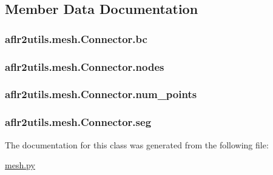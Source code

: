 \subsection{Member Data Documentation}
\hypertarget{classaflr2utils_1_1mesh_1_1Connector_a59689632fcfb6fc3470d0163b29bd823}{
\subsubsection[{bc}]{\setlength{\rightskip}{0pt plus 5cm}aflr2utils.\-mesh.\-Connector.\-bc}}\label{classaflr2utils_1_1mesh_1_1Connector_a59689632fcfb6fc3470d0163b29bd823}
\hypertarget{classaflr2utils_1_1mesh_1_1Connector_a820425dc41d23724ecab5ce72f336d0b}{
\subsubsection[{nodes}]{\setlength{\rightskip}{0pt plus 5cm}aflr2utils.\-mesh.\-Connector.\-nodes}}\label{classaflr2utils_1_1mesh_1_1Connector_a820425dc41d23724ecab5ce72f336d0b}
\hypertarget{classaflr2utils_1_1mesh_1_1Connector_a1c20205fb5946a6b3d5e9c2cf86f9173}{
\subsubsection[{num\-\_\-points}]{\setlength{\rightskip}{0pt plus 5cm}aflr2utils.\-mesh.\-Connector.\-num\-\_\-points}}\label{classaflr2utils_1_1mesh_1_1Connector_a1c20205fb5946a6b3d5e9c2cf86f9173}
\hypertarget{classaflr2utils_1_1mesh_1_1Connector_aeaa7d5ba24f17928e1c0c60cc2b92f70}{
\subsubsection[{seg}]{\setlength{\rightskip}{0pt plus 5cm}aflr2utils.\-mesh.\-Connector.\-seg}}\label{classaflr2utils_1_1mesh_1_1Connector_aeaa7d5ba24f17928e1c0c60cc2b92f70}


The documentation for this class was generated from the following file\-:\begin{DoxyCompactItemize}
\item 
\hyperlink{mesh_8py}{mesh.\-py}\end{DoxyCompactItemize}
